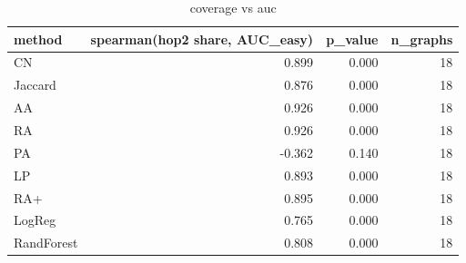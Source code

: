 \begin{table}[t]
\centering
\caption{coverage vs auc}
\label{tab:coverage_vs_auc}
\begin{tabular}{lrrr}
\hline
method & spearman(hop2 share, AUC\_easy) & p\_value & n\_graphs \\
\hline
CN & 0.899 & 0.000 & 18 \\
Jaccard & 0.876 & 0.000 & 18 \\
AA & 0.926 & 0.000 & 18 \\
RA & 0.926 & 0.000 & 18 \\
PA & -0.362 & 0.140 & 18 \\
LP & 0.893 & 0.000 & 18 \\
RA+ & 0.895 & 0.000 & 18 \\
LogReg & 0.765 & 0.000 & 18 \\
RandForest & 0.808 & 0.000 & 18 \\
\hline
\end{tabular}
\end{table}